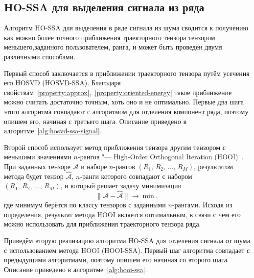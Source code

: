 \documentclass[specialist,
    substylefile = spbu_report.rtx,
    subf,href,colorlinks=true, 12pt]{disser}
\theoremstyle{plain}
\theoremstyle{definition}
\theoremstyle{remark}
\begin{document}
    \subsection{HO-SSA для выделения сигнала из ряда}\label{subsec:ho-ssa-signal}
    Алгоритм HO-SSA для выделения в ряде сигнала из шума сводится к получению
    как можно более точного приближения траекторного тензора тензором меньшего,\linebreak заданного пользователем, ранга, и может быть проведён двумя различными способами.

    Первый способ заключается в приближении траекторного тензора путём усечения его HOSVD (HOSVD-SSA).
    Благодаря свойствам~\ref{property:approx},~\ref{property:oriented-energy} такое приближение можно считать достаточно точным,
    хоть оно и не оптимально.
    Первые два шага этого алгоритма совпадают с алгоритмом для отделения компонент ряда, поэтому опишем его, начиная с третьего шага.
    Описание приведено в алгоритме~\ref{alg:hosvd-ssa-signal}.

    Второй способ использует метод приближения тензора другим тензором с меньшими значениями $n$-рангов "--- High-Order Orthogonal
    Iteration (HOOI)~\cite{hooi}.
    При заданных тензоре $\mathcal{A}$ и наборе $n$-рангов $(R_1,\, R_2,\, \ldots,\, R_M)$, результатом метода будет
    тензор $\hat{\mathcal{A}}$, $n$-ранги которого совпадают с набором $(R_1,\, R_2,\, \ldots,\, R_M)$, и который решает
    задачу минимизации
    \[
        \|\mathcal{A}-\hat{\mathcal{A}}\|\to \min,
    \]
    где минимум берётся по классу тензоров с заданными $n$-рангами.
    Исходя из определения, результат метода HOOI является оптимальным, в связи с чем его можно использовать
    для приближения траекторного тензора ряда.

    Приведём вторую реализацию алгоритма HO-SSA для отделения сигнала от шума с использованием метода HOOI (HOOI-SSA).
    Первый шаг алгоритма совпадает с предыдущими алгоритмами, поэтому опишем его начиная со второго шага.
    Описание приведено в алгоритме~\ref{alg:hooi-ssa}.
    
\end{document}
